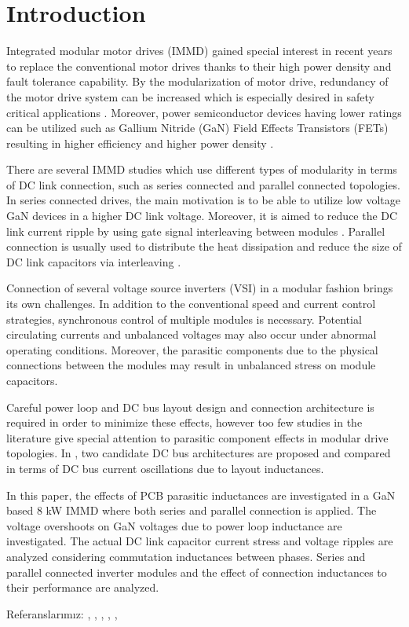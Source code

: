\section{Introduction}\label{sec:Intro}
Integrated modular motor drives (IMMD) gained special interest in recent years to replace the conventional motor drives thanks to their high power density and fault tolerance capability. By the modularization of motor drive, redundancy of the motor drive system can be increased which is especially desired in safety critical applications \cite{Zhang2017}. Moreover, power semiconductor devices having lower ratings can be utilized such as Gallium Nitride (GaN) Field Effects Transistors (FETs) resulting in higher efficiency and higher power density \cite{Wang2015b}.

There are several IMMD studies which use different types of modularity in terms of DC link connection, such as series connected \cite{Wang2015b} and parallel connected \cite{Zhang2017} topologies. In series connected drives, the main motivation is to be able to utilize low voltage GaN devices in a higher DC link voltage. Moreover, it is aimed to reduce the DC link current ripple by using gate signal interleaving between modules \cite{Wang2013}. Parallel connection is usually used to distribute the heat dissipation and reduce the size of DC link capacitors via interleaving \cite{Ugur2017}.

Connection of several voltage source inverters (VSI) in a modular fashion brings its own challenges. In addition to the conventional speed and current control strategies, synchronous control of multiple modules is necessary. Potential circulating currents and unbalanced voltages may also occur under abnormal operating conditions. Moreover, the parasitic components due to the physical connections between the modules may result in unbalanced stress on module capacitors.

Careful power loop and DC bus layout design and connection architecture is required in order to minimize these effects, however too few studies in the literature give special attention to parasitic component effects in modular drive topologies. In \cite{Brown2007}, two candidate DC bus architectures are proposed and compared in terms of DC bus current oscillations due to layout inductances.

In this paper, the effects of PCB parasitic inductances are investigated in a GaN based 8 kW IMMD where both series and parallel connection is applied. The voltage overshoots on GaN voltages due to power loop inductance are investigated. The actual DC link capacitor current stress and voltage ripples are analyzed considering commutation inductances between phases. Series and parallel connected inverter modules and the effect of connection inductances to their performance are analyzed.

Referanslarımız: \cite{Zhang2017}, \cite{Zlwka}, \cite{Wang2015b}, \cite{Brown2007}, \cite{Ugur2017}, \cite{Wang2013}


